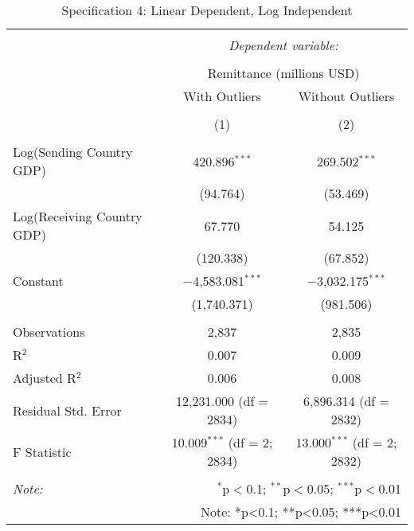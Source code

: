 
\begin{table}[!htbp] \centering 
  \caption{Specification 4: Linear Dependent, Log Independent} 
  \label{} 
\begin{tabular}{@{\extracolsep{5pt}}lcc} 
\\[-1.8ex]\hline 
\hline \\[-1.8ex] 
 & \multicolumn{2}{c}{\textit{Dependent variable:}} \\ 
\cline{2-3} 
\\[-1.8ex] & \multicolumn{2}{c}{Remittance (millions USD)} \\ 
 & With Outliers & Without Outliers \\ 
\\[-1.8ex] & (1) & (2)\\ 
\hline \\[-1.8ex] 
 Log(Sending Country GDP) & 420.896$^{***}$ & 269.502$^{***}$ \\ 
  & (94.764) & (53.469) \\ 
  Log(Receiving Country GDP) & 67.770 & 54.125 \\ 
  & (120.338) & (67.852) \\ 
  Constant & $-$4,583.081$^{***}$ & $-$3,032.175$^{***}$ \\ 
  & (1,740.371) & (981.506) \\ 
 \hline \\[-1.8ex] 
Observations & 2,837 & 2,835 \\ 
R$^{2}$ & 0.007 & 0.009 \\ 
Adjusted R$^{2}$ & 0.006 & 0.008 \\ 
Residual Std. Error & 12,231.000 (df = 2834) & 6,896.314 (df = 2832) \\ 
F Statistic & 10.009$^{***}$ (df = 2; 2834) & 13.000$^{***}$ (df = 2; 2832) \\ 
\hline 
\hline \\[-1.8ex] 
\textit{Note:}  & \multicolumn{2}{r}{$^{*}$p$<$0.1; $^{**}$p$<$0.05; $^{***}$p$<$0.01} \\ 
 & \multicolumn{2}{r}{Note: *p<0.1; **p<0.05; ***p<0.01} \\ 
\end{tabular} 
\end{table} 
